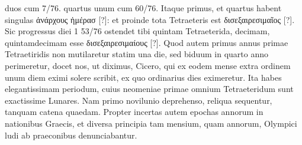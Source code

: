 duos cum 7/76. quartus unum cum 60/76.
Itaque primus, et quartus
habent singulas \textgreek{ἀνάρχους ἡμέρασ [?]}:
 et proinde tota Tetraeteris est \textgreek{δισεξαιρεσιμαῖος [?]}.
Sic progressus diei 1 53/76 ostendet tibi quintam Tetraeterida,
decimam, quintamdecimam esse \textgreek{δισεξαιρεσιμαίους [?]}.
Quod autem
primus annus primae Tetraetiridis non mutilaretur statim una die, sed
biduum in quarto anno perimeretur, docet nos, ut diximus, Cicero,
qui ex eodem mense extra ordinem unum diem eximi solere scribit, ex
quo ordinarius dies eximeretur.
Ita habes elegantissimam periodum,
cuius neomeniae primae omnium Tetraeteridum sunt exactissime Lunares.
Nam primo novilunio deprehenso, reliqua sequentur, tanquam
catena quaedam.
Propter incertas autem epochas annorum in nationibus
Graecis, et diversa principia tam mensium, quam annorum, Olympici
ludi ab praeconibus denunciabantur.

